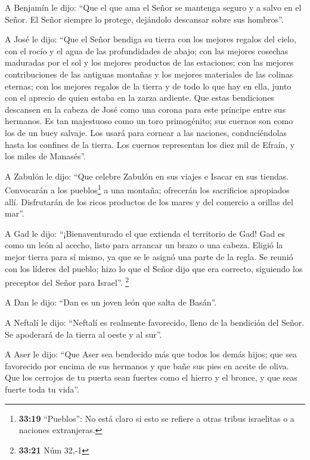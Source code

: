  A Benjamín le dijo: ``Que el que ama el Señor se
mantenga seguro y a salvo en el Señor. El Señor siempre lo protege,
dejándolo descansar sobre sus hombros''.

 A José le dijo: ``Que el Señor bendiga su tierra con los
mejores regalos del cielo, con el rocío y el agua de las profundidades
de abajo;  con las mejores cosechas maduradas por el sol
y los mejores productos de las estaciones;  con las
mejores contribuciones de las antiguas montañas y los mejores materiales
de las colinas eternas;  con los mejores regalos de la
tierra y de todo lo que hay en ella, junto con el aprecio de quien
estaba en la zarza ardiente. Que estas bendiciones descansen en la
cabeza de José como una corona para este príncipe entre sus hermanos.
 Es tan majestuoso como un toro primogénito; sus cuernos
son como los de un buey salvaje. Los usará para cornear a las naciones,
conduciéndolas hasta los confines de la tierra. Los cuernos representan
los diez mil de Efraín, y los miles de Manasés''.

 A Zabulón le dijo: ``Que celebre Zabulón en sus viajes e
Isacar en sus tiendas.  Convocarán a los
pueblos\footnote{\textbf{33:19} ``Pueblos'': No está claro si esto se
  refiere a otras tribus israelitas o a naciones extranjeras.} a una
montaña; ofrecerán los sacrificios apropiados allí. Disfrutarán de los
ricos productos de los mares y del comercio a orillas del mar''.

 A Gad le dijo: ``¡Bienaventurado el que extienda el
territorio de Gad! Gad es como un león al acecho, listo para arrancar un
brazo o una cabeza.  Eligió la mejor tierra para sí
mismo, ya que se le asignó una parte de la regla. Se reunió con los
líderes del pueblo; hizo lo que el Señor dijo que era correcto,
siguiendo los preceptos del Señor para Israel''. \footnote{\textbf{33:21}
  Núm 32,-1}

 A Dan le dijo: ``Dan es un joven león que salta de
Basán''.

 A Neftalí le dijo: ``Neftalí es realmente favorecido,
lleno de la bendición del Señor. Se apoderará de la tierra al oeste y al
sur''.

 A Aser le dijo: ``Que Aser sea bendecido más que todos
los demás hijos; que sea favorecido por encima de sus hermanos y que
bañe sus pies en aceite de oliva.  Que los cerrojos de tu
puerta sean fuertes como el hierro y el bronce, y que seas fuerte toda
tu vida''.

